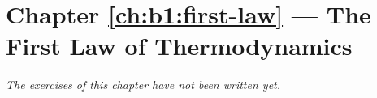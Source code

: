 \section*{Chapter \ref{ch:b1:first-law} --- The First Law of Thermodynamics}


\emph{The exercises of this chapter have not been written yet.}
